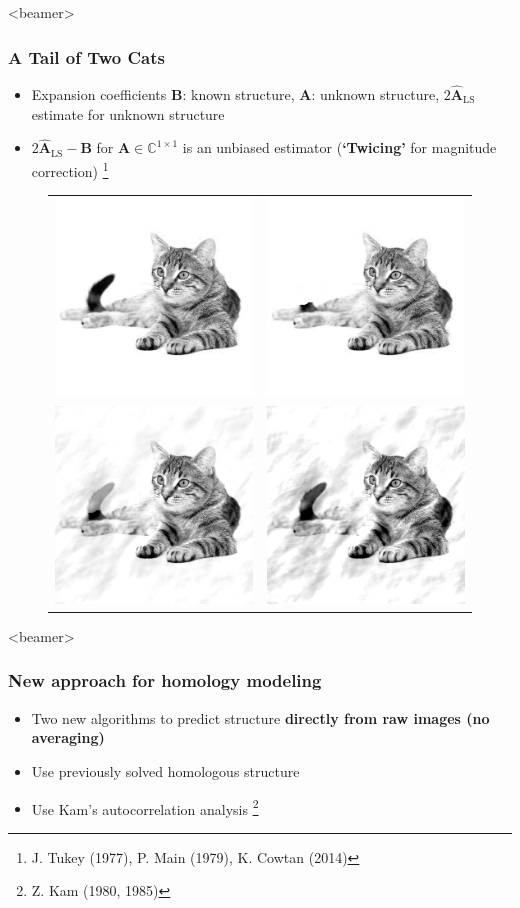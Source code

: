 \documentclass{beamer}
\newcommand\blfootnote[1]{%
  \begingroup
  \renewcommand\thefootnote{}\footnote{#1}%
  \addtocounter{footnote}{-1}%
  \endgroup
}
\def\bA{\boldsymbol{A}}
\def\bB{\boldsymbol{B}}
\begin{document}
\begin{frame}<beamer>
\frametitle{A Tail of Two Cats}
\begin{itemize}

\item Expansion coefficients $\bB$: known structure, $\bA$: unknown structure, $2\hat{\bA}_{\text{LS}}$ estimate for unknown structure
\item $2\hat{\bA}_{\text{LS}}-\bB$ for $\bA\in\mathbb{C}^{1\times 1}$ is an unbiased estimator (\textbf{`Twicing'} for magnitude correction) \blfootnote{J. Tukey (1977), P. Main (1979), K. Cowtan (2014)}
\end{itemize}
\begin{figure}[]
\centering
\begin{tabular}{cc}
\includegraphics[width=0.15\linewidth]{figures/cat.png}
&\includegraphics[width=0.15\linewidth]{figures/cat_tail.png}\\
\includegraphics[width=0.15\linewidth]{figures/cat_t1.png}
&\includegraphics[width=0.15\linewidth]{figures/cat_t2.png}\\
\end{tabular}
\label{fig:tail_cat}
\end{figure}
\end{frame}

\begin{frame}<beamer>
\frametitle{New approach for homology modeling}
\begin{itemize}
\item Two new algorithms to predict structure \textbf{directly from raw images (no averaging)}
\item Use previously solved homologous structure 
\item Use Kam's autocorrelation analysis \blfootnote{Z. Kam (1980, 1985)}
\end{itemize}
\end{frame}
\end{document}
